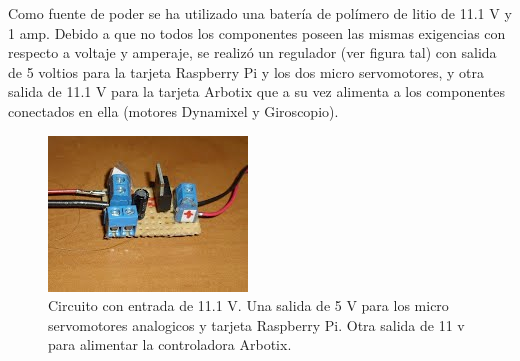 Como fuente de poder se ha utilizado una batería de polímero de litio de 11.1 V y 1 amp. Debido a que no todos los componentes poseen las mismas exigencias con respecto a voltaje y amperaje, se realizó un regulador (ver figura tal) con  salida de 5 voltios para la tarjeta Raspberry Pi y los dos micro servomotores, y otra salida de 11.1 V para la tarjeta Arbotix que a su vez alimenta a los componentes conectados en ella (motores Dynamixel y Giroscopio).

\begin{figure}[hbtp]
\centering
\includegraphics[scale=0.8]{imagenes/circuito.jpg}
\caption{Circuito con entrada de 11.1 V. Una salida de 5 V para los micro servomotores analogicos y tarjeta Raspberry Pi. Otra salida de 11 v para alimentar la controladora Arbotix.   }
\end{figure}

